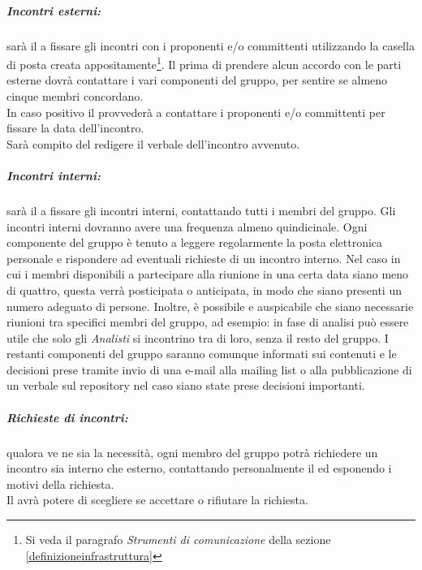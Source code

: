 \subparagraph{Incontri esterni:} sarà il \projectManager{} a fissare gli incontri con i proponenti e/o committenti utilizzando la casella di posta creata appositamente\footnote{Si veda il paragrafo \textit{Strumenti di comunicazione} della sezione \ref{definizioneinfrastruttura}}.
Il \projectManager{} prima di prendere alcun accordo con le parti esterne dovrà contattare i vari componenti del gruppo, per sentire se almeno cinque membri concordano.
\\In caso positivo il \projectManager{} provvederà a contattare i proponenti e/o committenti per fissare la data dell'incontro.
\\Sarà compito del \projectManager{} redigere il verbale dell'incontro avvenuto.

\subparagraph{Incontri interni:} sarà il \projectManager{} a fissare gli incontri interni, contattando tutti i membri del gruppo. Gli incontri interni dovranno avere una frequenza almeno quindicinale.
Ogni componente del gruppo è tenuto a leggere regolarmente la posta elettronica personale e rispondere ad eventuali richieste di un incontro interno.
Nel caso in cui i membri disponibili a partecipare alla riunione in una certa data siano meno di quattro, questa verrà posticipata o anticipata, in modo che siano presenti un numero adeguato di persone.
Inoltre, è possibile e auspicabile che siano necessarie riunioni tra specifici membri del gruppo, ad esempio: in fase di analisi può essere utile che solo gli \emph{Analisti} si incontrino tra di loro, senza il resto del gruppo.
I restanti componenti del gruppo saranno comunque informati sui contenuti e le decisioni prese tramite invio di una e-mail alla mailing list\glossario{} o alla pubblicazione di un verbale sul repository\glossario{} nel caso siano state prese decisioni importanti.
\subparagraph{Richieste di incontri:} qualora ve ne sia la necessità, ogni membro del gruppo potrà richiedere un incontro sia interno che esterno, contattando personalmente il \projectManager{} ed esponendo i motivi della richiesta.
\\Il \projectManager{} avrà potere di scegliere se accettare o rifiutare la richiesta.


